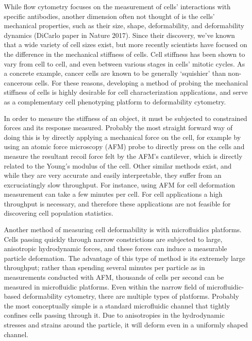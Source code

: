 		While flow cytometry focuses on the measurement of cells' interactions with specific antibodies, another dimension often not thought of is the cells' mechanical properties, such as their size, shape, deformability, and deformability dynamics \cite{Lin2017} (DiCarlo paper in Nature 2017). Since their discovery, we've known that a wide variety of cell sizes exist, but more recently scientists have focused on the difference in the mechanical stiffness of cells. Cell stiffness has been shown to vary from cell to cell, and even between various stages in cells' mitotic cycles. As a concrete example, cancer cells are known to be generally `squishier' than non-cancerous cells. For these reasons, developing a method of probing the mechanical stiffness of cells is highly desirable for cell characterization applications, and serve as a complementary cell phenotyping platform to deformability cytometry.
		
		In order to measure the stiffness of an object, it must be subjected to constrained forces and its response measured. Probably the most straight forward way of doing this is by directly applying a mechanical force on the cell, for example by using an atomic force microscopy (AFM) probe to directly press on the cells and measure the resultant recoil force felt by the AFM's cantilever, which is directly related to the Young's modulus of the cell. Other similar methods exist, and while they are very accurate and easily interpretable, they suffer from an excruciatingly slow throughput. For instance, using AFM for cell deformation measurement can take a few minutes per cell. For cell applications a high throughput is necessary, and therefore these applications are not feasible for discovering cell population statistics.
		
		Another method of measuring cell deformability is with microfluidics platforms. Cells passing quickly through narrow constrictions are subjected to large, anisotropic hydrodynamic forces, and these forces can induce a measurable particle deformation. The advantage of this type of method is its extremely large throughput; rather than spending several minutes per particle as in measurements conducted with AFM, thousands of cells per second can be measured in microfluidic platforms. Even within the narrow field of microfluidic-based deformability cytometry, there are multiple types of platforms. Probably the most conceptually simple is a standard microfluidic channel that tightly confines cells passing through it. Due to anisotropies in the hydrodynamic stresses and strains around the particle, it will deform even in a uniformly shaped channel.
		
